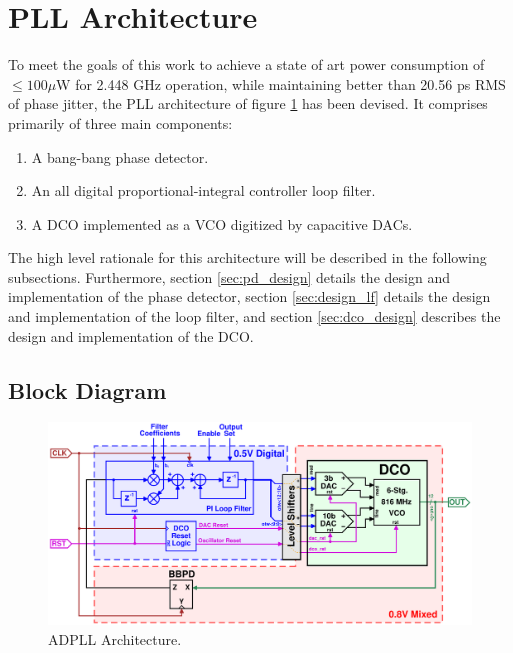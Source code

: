 \section{PLL Architecture}\label{pll_arch}
To meet the goals of this work to achieve a state of art power consumption of $\leq 100\mu$W for 2.448 GHz operation, while maintaining better than 20.56 ps RMS of phase jitter, the PLL architecture of figure \ref{fig:pll_arch} has been devised. It comprises primarily of three main components:
\begin{enumerate}[itemsep=0pt,label=\protect\mycirc{\arabic*}]
	\setlength\itemsep{-0.8em}
	\item A bang-bang phase detector.
	\item An all digital proportional-integral controller loop filter.
	\item A DCO implemented as a VCO digitized by capacitive DACs.
\end{enumerate}
The high level rationale for this architecture will be described in the following subsections. Furthermore, section \ref{sec:pd_design} details the design and implementation of the phase detector, section \ref{sec:design_lf} details the design and implementation of the loop filter, and section \ref{sec:dco_design} describes the design and implementation of the DCO.

	\subsection{Block Diagram}
			\begin{figure}[htb!]
		        \centering
		        \includegraphics[width=1\textwidth, angle=0]{./figs/design/pll_master_arch_final3}
			    \caption{ADPLL Architecture.}
			    \label{fig:pll_arch}
			\end{figure}

